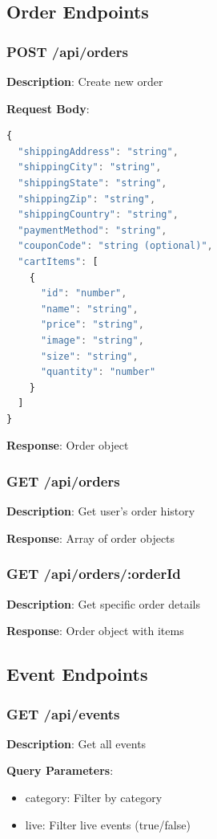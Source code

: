 \documentclass{scrreprt}
\begin{document}
\subsection{Order Endpoints}

\subsubsection{POST /api/orders}
\textbf{Description}: Create new order

\textbf{Request Body}:
\begin{lstlisting}[language=JavaScript]
{
  "shippingAddress": "string",
  "shippingCity": "string",
  "shippingState": "string",
  "shippingZip": "string",
  "shippingCountry": "string",
  "paymentMethod": "string",
  "couponCode": "string (optional)",
  "cartItems": [
    {
      "id": "number",
      "name": "string",
      "price": "string",
      "image": "string",
      "size": "string",
      "quantity": "number"
    }
  ]
}
\end{lstlisting}

\textbf{Response}: Order object

\subsubsection{GET /api/orders}
\textbf{Description}: Get user's order history

\textbf{Response}: Array of order objects

\subsubsection{GET /api/orders/:orderId}
\textbf{Description}: Get specific order details

\textbf{Response}: Order object with items

\subsection{Event Endpoints}

\subsubsection{GET /api/events}
\textbf{Description}: Get all events

\textbf{Query Parameters}:
\begin{itemize}
\item category: Filter by category
\item live: Filter live events (true/false)
\end{itemize}
\end{document}
